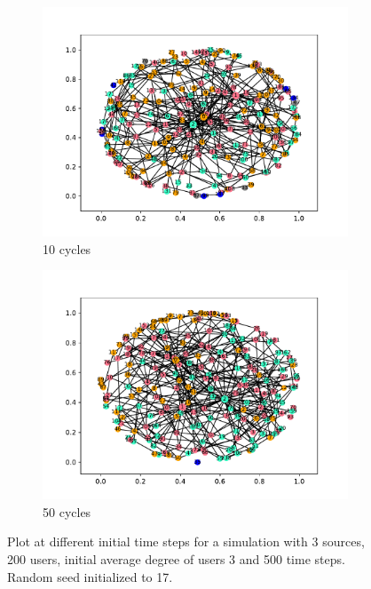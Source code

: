 \begin{figure}[!h]
  \begin{subfigure}[t]{.45\textwidth}
    \centering
    \includegraphics[trim={1cm .5cm 1cm 1cm}, clip, width=\linewidth]{img/pdf/plot-0010.pdf} 
    \caption{10 cycles}
    \label{fig:10}
  \end{subfigure}
  \begin{subfigure}[t]{.45\textwidth}
    \centering
    \includegraphics[trim={1cm .5cm 1cm 1cm}, clip, width=\linewidth]{img/pdf/plot-0050.pdf} 
    \caption{50 cycles}
    \label{fig:50}
  \end{subfigure}
 
  \caption{Plot at different initial time steps for a simulation with 3 sources, 200 users, initial average degree of users 3 and 500 time steps. Random seed initialized to 17.}
\end{figure}


